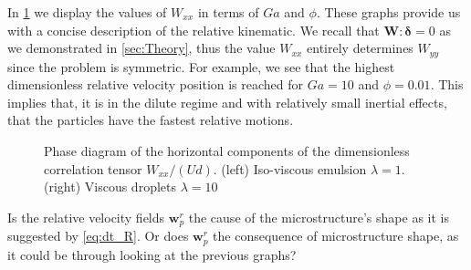 In \ref{fig:phase} we display the values of $W_{xx}$ in terms of $Ga$ and $\phi$. 
These graphs provide us with a concise description of the relative kinematic. 
We recall that $\textbf{W}:\bm\delta = 0$ as we demonstrated in \ref{sec:Theory}, thus the value  $W_{xx}$ entirely determines $W_{yy}$ since the problem is symmetric. 
For example, we see that the highest dimensionless relative velocity position is reached for $Ga = 10$ and $\phi = 0.01$. 
This implies that, it is in the dilute regime and with relatively small inertial effects, that the particles have the fastest relative motions. 
\begin{figure}[h!]
    \centering
    \caption{Phase diagram of the horizontal components of the dimensionless correlation tensor $W_{xx}/(Ud)$. 
        (left) Iso-viscous emulsion $\lambda = 1$.
        (right) Viscous droplets $\lambda = 10$ }
    \label{fig:phase}
\end{figure}
Is the relative velocity fields $\textbf{w}_p^r$ the cause of the microstructure's shape as it is suggested by \ref{eq:dt_R}. 
Or does $\textbf{w}_p^r$ the consequence of microstructure shape, as it could be through looking at the previous graphs?
